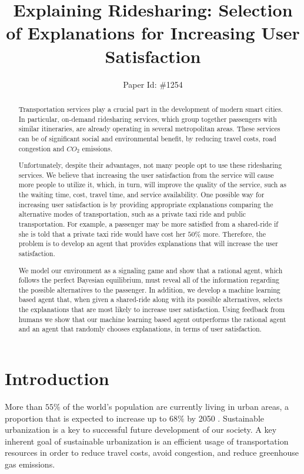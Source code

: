 \documentclass[letterpaper]{article} %
\title{Explaining Ridesharing: Selection of Explanations for Increasing User Satisfaction}
\author{Paper Id: \#1254}
\begin{document}
\maketitle
\begin{abstract}
Transportation services play a crucial part in the development of modern smart cities.  
In particular, on-demand ridesharing services, which group together passengers with similar itineraries, are already operating in several metropolitan areas.
These services can be of significant social and environmental benefit, by reducing travel costs, road congestion and $CO_2$ emissions. 

Unfortunately, despite their advantages, not many people opt to use these ridesharing services. We believe that increasing the user satisfaction from the service will cause more people to utilize it, which, in turn, will improve the quality of the service, such as the waiting time, cost, travel time, and service availability. One possible way for increasing user satisfaction is by providing appropriate explanations comparing the alternative modes of transportation, such as a private taxi ride and public transportation. For example, a passenger may be more satisfied from a shared-ride if she is told that a private taxi ride would have cost her $50\%$ more. Therefore, the problem is to develop an agent that provides explanations that will increase the user satisfaction.

We model our environment as a signaling game and show that a rational agent, which follows the perfect Bayesian equilibrium, must reveal all of the information regarding the possible alternatives to the passenger.
In addition, we develop a machine learning based agent that, when given a shared-ride along with its possible alternatives, selects the explanations that are most likely to increase user satisfaction.
Using feedback from humans we show that our machine learning based agent outperforms the rational agent and an agent that randomly chooses explanations, in terms of user satisfaction.
\end{abstract}


\section{Introduction}
More than $55\%$ of the world’s population are currently living in urban areas, a proportion that is expected to increase up to $68\%$ by 2050 \cite{united2018}. Sustainable urbanization is a key to successful future development of our society. A key inherent goal of sustainable urbanization is an efficient usage of transportation resources in order to reduce travel costs, avoid congestion, and reduce greenhouse gas emissions. 
\end{document}
